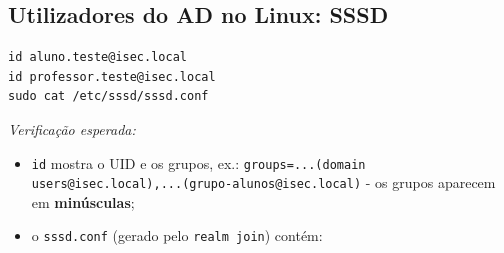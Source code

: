 
\subsection[Utilizadores do AD no Linux: SSSD]{Utilizadores do AD no Linux: SSSD}


\begin{lstlisting}[style=bashstyle]
id aluno.teste@isec.local
id professor.teste@isec.local
sudo cat /etc/sssd/sssd.conf
\end{lstlisting}

\emph{Verificação esperada:}

\begin{itemize}
\item \texttt{id} mostra o UID e os grupos, ex.: \texttt{groups=...(domain users@isec.local),\allowbreak{}...(grupo-alunos@isec.local)} - os grupos aparecem em \textbf{minúsculas};
\item o \texttt{sssd.conf} (gerado pelo \texttt{realm join}) contém:
\end{itemize}

